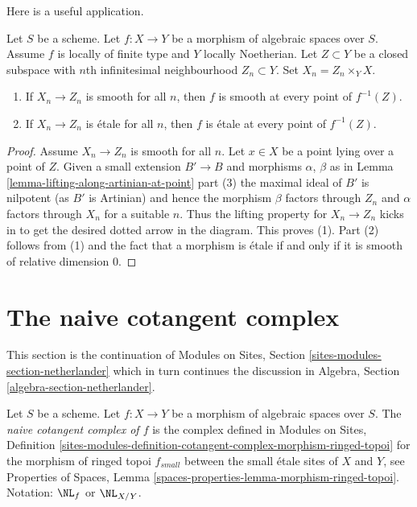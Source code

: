 \noindent
Here is a useful application.

\begin{lemma}
\label{lemma-check-smoothness-on-infinitesimal-nbhds}
Let $S$ be a scheme. Let $f : X \to Y$ be a morphism of
algebraic spaces over $S$. Assume $f$ is
locally of finite type and $Y$ locally Noetherian.
Let $Z \subset Y$ be a closed subspace with $n$th infinitesimal
neighbourhood $Z_n \subset Y$. Set $X_n = Z_n \times_Y X$.
\begin{enumerate}
\item If $X_n \to Z_n$ is smooth for all $n$, then $f$
is smooth at every point of $f^{-1}(Z)$.
\item If $X_n \to Z_n$ is \'etale for all $n$, then $f$
is \'etale at every point of $f^{-1}(Z)$.
\end{enumerate}
\end{lemma}

\begin{proof}
Assume $X_n \to Z_n$ is smooth for all $n$.
Let $x \in X$ be a point lying over a point of $Z$.
Given a small extension $B' \to B$ and morphisms $\alpha$, $\beta$ as in
Lemma \ref{lemma-lifting-along-artinian-at-point} part (3)
the maximal ideal of $B'$ is nilpotent (as $B'$ is Artinian)
and hence the morphism $\beta$ factors through $Z_n$ and $\alpha$ factors
through $X_n$ for a suitable $n$. Thus the lifting property for
$X_n \to Z_n$ kicks in to get the desired dotted arrow in the diagram.
This proves (1). Part (2) follows from (1) and the fact that a morphism
is \'etale if and only if it is smooth of relative dimension $0$.
\end{proof}











\section{The naive cotangent complex}
\label{section-netherlander}

\noindent
This section is the continuation of
Modules on Sites, Section \ref{sites-modules-section-netherlander}
which in turn continues the discussion in
Algebra, Section \ref{algebra-section-netherlander}.

\begin{definition}
\label{definition-netherlander}
Let $S$ be a scheme.
Let $f : X \to Y$ be a morphism of algebraic spaces over $S$.
The {\it naive cotangent complex of $f$}
is the complex defined in Modules on Sites, Definition
\ref{sites-modules-definition-cotangent-complex-morphism-ringed-topoi}
for the morphism of ringed topoi $f_{small}$ between the
small \'etale sites of $X$ and $Y$, see
Properties of Spaces, Lemma
\ref{spaces-properties-lemma-morphism-ringed-topoi}.
Notation: $\NL_f$ or $\NL_{X/Y}$.
\end{definition}

